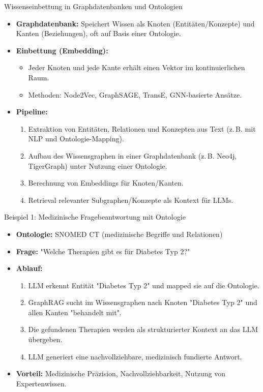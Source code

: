 \documentclass[aspectratio=1610, xcolor=dvipsnames, 9pt]{beamer}
\begin{document}
\begin{frame}{Wissenseinbettung in Graphdatenbanken und Ontologien}
  \begin{itemize}
    \item \textbf{Graphdatenbank:} Speichert Wissen als Knoten (Entitäten/Konzepte) und Kanten (Beziehungen), oft auf Basis einer Ontologie.
    \item \textbf{Einbettung (Embedding):}
      \begin{itemize}
        \item Jeder Knoten und jede Kante erhält einen Vektor im kontinuierlichen Raum.
        \item Methoden: Node2Vec, GraphSAGE, TransE, GNN-basierte Ansätze.
      \end{itemize}
    \item \textbf{Pipeline:}
      \begin{enumerate}
        \item Extraktion von Entitäten, Relationen und Konzepten aus Text (z. B. mit NLP und Ontologie-Mapping).
        \item Aufbau des Wissensgraphen in einer Graphdatenbank (z. B. Neo4j, TigerGraph) unter Nutzung einer Ontologie.
        \item Berechnung von Embeddings für Knoten/Kanten.
        \item Retrieval relevanter Subgraphen/Konzepte als Kontext für LLMs.
      \end{enumerate}
  \end{itemize}
\end{frame}

\begin{frame}{Beispiel 1: Medizinische Fragebeantwortung mit Ontologie}
  \begin{itemize}
    \item \textbf{Ontologie:} SNOMED CT (medizinische Begriffe und Relationen)
    \item \textbf{Frage:} "Welche Therapien gibt es für Diabetes Typ 2?"
    \item \textbf{Ablauf:}
      \begin{enumerate}
        \item LLM erkennt Entität "Diabetes Typ 2" und mapped sie auf die Ontologie.
        \item GraphRAG sucht im Wissensgraphen nach Knoten "Diabetes Typ 2" und allen Kanten "behandelt mit".
        \item Die gefundenen Therapien werden als strukturierter Kontext an das LLM übergeben.
        \item LLM generiert eine nachvollziehbare, medizinisch fundierte Antwort.
      \end{enumerate}
    \item \textbf{Vorteil:} Medizinische Präzision, Nachvollziehbarkeit, Nutzung von Expertenwissen.
  \end{itemize}
\end{frame}
\end{document}
